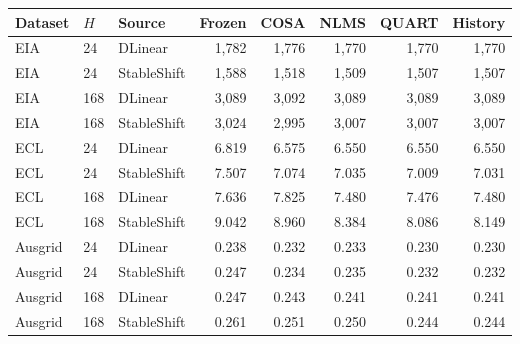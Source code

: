 \begin{tabular}{lllrrrrr}
\toprule
Dataset & $H$ & Source & Frozen & COSA & NLMS & QUART & History\\
\midrule
EIA & 24 & DLinear & 1,782 & 1,776 & 1,770 & 1,770 & 1,770\\
EIA & 24 & StableShift & 1,588 & 1,518 & 1,509 & 1,507 & 1,507\\
EIA & 168 & DLinear & 3,089 & 3,092 & 3,089 & 3,089 & 3,089\\
EIA & 168 & StableShift & 3,024 & 2,995 & 3,007 & 3,007 & 3,007\\
ECL & 24 & DLinear & 6.819 & 6.575 & 6.550 & 6.550 & 6.550\\
ECL & 24 & StableShift & 7.507 & 7.074 & 7.035 & 7.009 & 7.031\\
ECL & 168 & DLinear & 7.636 & 7.825 & 7.480 & 7.476 & 7.480\\
ECL & 168 & StableShift & 9.042 & 8.960 & 8.384 & 8.086 & 8.149\\
Ausgrid & 24 & DLinear & 0.238 & 0.232 & 0.233 & 0.230 & 0.230\\
Ausgrid & 24 & StableShift & 0.247 & 0.234 & 0.235 & 0.232 & 0.232\\
Ausgrid & 168 & DLinear & 0.247 & 0.243 & 0.241 & 0.241 & 0.241\\
Ausgrid & 168 & StableShift & 0.261 & 0.251 & 0.250 & 0.244 & 0.244\\
\bottomrule
\end{tabular}
